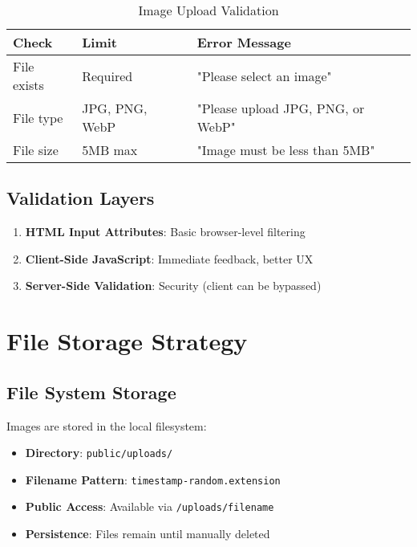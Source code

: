 \documentclass[12pt,a4paper]{report}
\begin{document}
\begin{table}[H]
\centering
\caption{Image Upload Validation}
\begin{tabular}{@{}lll@{}}
\toprule
\textbf{Check} & \textbf{Limit} & \textbf{Error Message} \\ \midrule
File exists & Required & "Please select an image" \\
File type & JPG, PNG, WebP & "Please upload JPG, PNG, or WebP" \\
File size & 5MB max & "Image must be less than 5MB" \\ \bottomrule
\end{tabular}
\end{table}

\subsection{Validation Layers}

\begin{enumerate}
    \item \textbf{HTML Input Attributes}: Basic browser-level filtering
    \item \textbf{Client-Side JavaScript}: Immediate feedback, better UX
    \item \textbf{Server-Side Validation}: Security (client can be bypassed)
\end{enumerate}

\section{File Storage Strategy}

\subsection{File System Storage}

Images are stored in the local filesystem:

\begin{itemize}
    \item \textbf{Directory}: \texttt{public/uploads/}
    \item \textbf{Filename Pattern}: \texttt{timestamp-random.extension}
    \item \textbf{Public Access}: Available via \texttt{/uploads/filename}
    \item \textbf{Persistence}: Files remain until manually deleted
\end{itemize}
\end{document}
